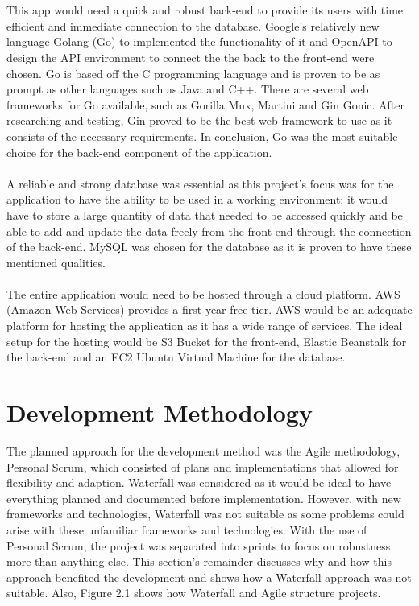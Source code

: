 \\\\ This app would need a quick and robust back-end to provide its users with time efficient and immediate connection to the database. Google's relatively new language Golang (Go) to implemented the functionality of it and OpenAPI to design the API environment to connect the the back to the front-end were chosen. Go is based off the C programming language and is proven to be as prompt as other languages such as Java and C++. There are several web frameworks for Go available, such as Gorilla Mux, Martini and Gin Gonic. After researching and testing, Gin proved to be the best web framework to use as it consists of the necessary requirements. In conclusion, Go was the most suitable choice for the back-end component of the application.
\\\\ A reliable and strong database was essential as this project's focus was for the application to have the ability to be used in a working environment; it would have to store a large quantity of data that needed to be accessed quickly and be able to add and update the data freely from the front-end through the connection of the back-end. MySQL was chosen for the database as it is proven to have these mentioned qualities. 
\\\\ The entire application would need to be hosted through a cloud platform. AWS (Amazon Web Services) provides a first year free tier. AWS would be an adequate platform for hosting the application as it has a wide range of services. The ideal setup for the hosting would be S3 Bucket for the front-end, Elastic Beanstalk for the back-end and an EC2 Ubuntu Virtual Machine for the database.

\section{Development Methodology}
The planned approach for the development method was the Agile methodology, Personal Scrum, which consisted of plans and implementations that allowed for flexibility and adaption. Waterfall was considered as it would be ideal to have everything planned and documented before implementation. However, with new frameworks and technologies, Waterfall was not suitable as some problems could arise with these unfamiliar frameworks and technologies. With the use of Personal Scrum, the project was separated into sprints to focus on robustness more than anything else. This section's remainder discusses why and how this approach benefited the development and shows how a Waterfall approach was not suitable. Also, Figure 2.1 shows how Waterfall and Agile structure projects.

